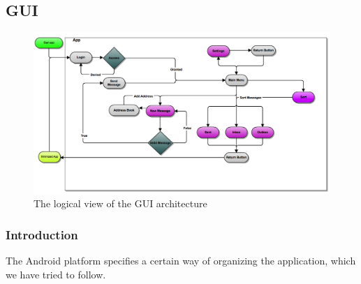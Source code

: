 \subsection{GUI}
\begin{figure}
	\includegraphics[width=\textwidth]{Android_GUI_flow_chart_2}
	\caption{The logical view of the GUI architecture}
	\label{fig:logicalGUIview}
\end{figure}

\subsubsection{Introduction}
The Android platform specifies a certain way of organizing the application, which we have tried to follow.

